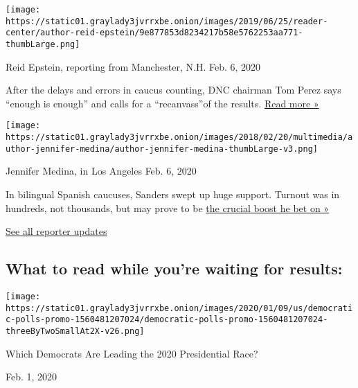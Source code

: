 \texttt{[image: https://static01.graylady3jvrrxbe.onion/images/2019/06/25/reader-center/author-reid-epstein/9e877853d8234217b58e5762253aa771-thumbLarge.png]}

Reid Epstein, reporting from Manchester, N.H. Feb. 6, 2020

After the delays and errors in caucus counting, DNC chairman Tom Perez
says ``enough is enough'' and calls for a ``recanvass''of the results.
\href{https://www.nytimes3xbfgragh.onion/live/2020/iowa-caucus-nh-primary-02-06?action=click\&module=ELEX_results\&pgtype=Interactive\&region=ReporterUpdates\#tom-perez-iowa}{Read
more »}

\texttt{[image: https://static01.graylady3jvrrxbe.onion/images/2018/02/20/multimedia/author-jennifer-medina/author-jennifer-medina-thumbLarge-v3.png]}

Jennifer Medina, in Los Angeles Feb. 6, 2020

In bilingual Spanish caucuses, Sanders swept up huge support. Turnout
was in hundreds, not thousands, but may prove to be
\href{https://www.nytimes3xbfgragh.onion/article/latinos-iowa-caucus.html?action=click\&module=ELEX_results\&pgtype=Interactive\&region=ReporterUpdates}{the
crucial boost he bet on »}

\href{https://www.nytimes3xbfgragh.onion/interactive/2020/02/03/us/elections/results-iowa-caucus-live-updates.html?action=click\&module=ELEX_results\&pgtype=Interactive\&region=Component}{See
all reporter updates}

\hypertarget{what-to-read-while-youre-waiting-for-results}{%
\subsection{What to read while you're waiting for
results:}\label{what-to-read-while-youre-waiting-for-results}}

\href{https://www.nytimes3xbfgragh.onion/interactive/2020/us/elections/democratic-polls.html?action=click\&module=ELEX_results\&pgtype=Interactive\&region=RelatedCoverage}{}

\texttt{[image: https://static01.graylady3jvrrxbe.onion/images/2020/01/09/us/democratic-polls-promo-1560481207024/democratic-polls-promo-1560481207024-threeByTwoSmallAt2X-v26.png]}

Which Democrats Are Leading the 2020 Presidential Race?

Feb. 1, 2020

\href{https://www.nytimes3xbfgragh.onion/interactive/2020/01/30/us/politics/democratic-presidential-candidates-quiz.html?action=click\&module=ELEX_results\&pgtype=Interactive\&region=RelatedCoverage}{}

